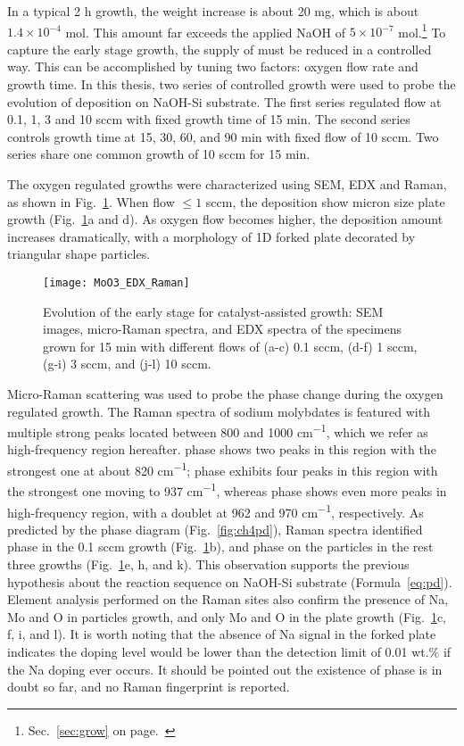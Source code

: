 In a typical 2 h growth, the  weight increase is about 20 mg, which is about $1.4\times 10^{-4}$ mol. This amount far exceeds the applied NaOH of $5\times 10^{-7}$ mol.\footnote{Sec.~\ref{sec:grow} on page.~\pageref{sec:grow}} To capture the early stage growth, the supply of  must be reduced in a controlled way. This can be accomplished by tuning two factors: oxygen flow rate and growth time. In this thesis, two series of controlled growth were used to probe the evolution of  deposition on NaOH-Si substrate. The first series regulated  flow at 0.1, 1, 3 and 10 sccm with fixed growth time of 15 min. The second series controls growth time at 15, 30, 60, and 90 min with fixed  flow of 10 sccm. Two series share one common growth of 10 sccm  for 15 min. 

The oxygen regulated growths were characterized using SEM, EDX and Raman, as shown in Fig.~\ref{fig:ch4oxy}. When  flow $\leq 1$ sccm, the deposition show micron size plate growth (Fig.~\ref{fig:ch4oxy}a and d). As oxygen flow becomes higher, the deposition amount increases dramatically, with a morphology of 1D forked plate decorated by triangular shape particles.
\begin{figure}[htb]
\centering
\texttt{[image: MoO3\_EDX\_Raman]}
\caption[Evolution of the early stage for catalyst-assisted  growth]{Evolution of the early stage for catalyst-assisted  growth: SEM images, micro-Raman spectra, and EDX spectra of the specimens grown for 15 min with different  flows of (a-c) 0.1 sccm, (d-f) 1 sccm, (g-i) 3 sccm, and (j-l) 10 sccm. }
\label{fig:ch4oxy}
\end{figure}

Micro-Raman scattering was used to probe the phase change during the oxygen regulated growth. The Raman spectra of sodium molybdates is featured with multiple strong peaks located between 800 and 1000 \si{cm^{-1}}, which we refer as high-frequency region hereafter.  phase shows two peaks in this region with the strongest one at about 820 \si{cm^{-1}};  phase exhibits four peaks in this region with the strongest one moving to 937 \si{cm^{-1}}, whereas  phase shows even more peaks in high-frequency region, with a doublet at 962 and 970 \si{cm^{-1}}, respectively.\cite{Schofield2005,Saraiva2011} As predicted by the phase diagram (Fig.~\ref{fig:ch4pd}), Raman spectra identified  phase in the 0.1 sccm growth (Fig.~\ref{fig:ch4oxy}b), and  phase on the particles in the rest three growths (Fig.~\ref{fig:ch4oxy}e, h, and k). This observation supports the previous hypothesis about the reaction sequence on NaOH-Si substrate (Formula~\ref{eq:pd}). Element analysis performed on the Raman sites also confirm the presence of Na, Mo and O in particles growth, and only Mo and O in the plate growth (Fig.~\ref{fig:ch4oxy}c, f, i, and l). It is worth noting that the absence of Na signal in the forked  plate indicates the doping level would be lower than the detection limit of 0.01 wt.\% if the Na doping ever occurs. It should be pointed out the existence of  phase is in doubt so far, and no Raman fingerprint is reported.\cite{Fomichev1992}  

